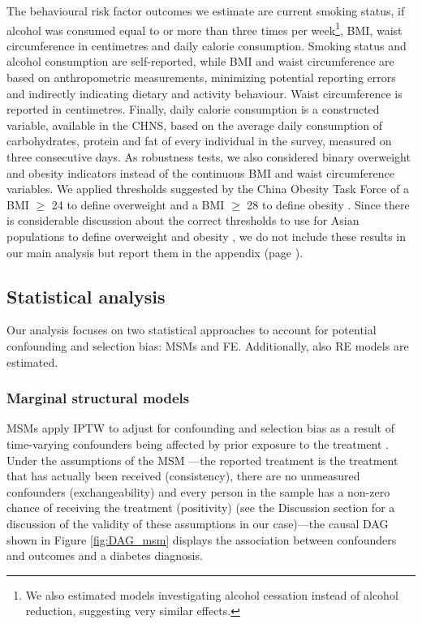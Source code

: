 The behavioural risk factor outcomes we estimate are current smoking status, if alcohol was consumed equal to or more than three times per week\footnote{We also estimated models investigating alcohol cessation instead of alcohol reduction, suggesting very similar effects.}, \ac{BMI}, waist circumference in centimetres and daily calorie consumption. Smoking status and alcohol consumption are self-reported, while \ac{BMI} and waist circumference are based on anthropometric measurements, minimizing potential reporting errors and indirectly indicating dietary and activity behaviour. Waist circumference is reported in centimetres. Finally, daily calorie consumption is a constructed variable, available in the \ac{CHNS}, based on the average daily consumption of carbohydrates, protein and fat of every individual in the survey, measured on three consecutive days. As robustness tests, we also considered binary overweight and obesity indicators instead of the continuous \ac{BMI} and waist circumference variables. We applied thresholds suggested by the China Obesity Task Force of a \ac{BMI} $\geq$ 24 to define overweight and a \ac{BMI} $\geq$ 28 to define obesity \parencite{group2004body}. Since there is considerable discussion about the correct thresholds to use for Asian populations to define overweight and obesity \parencite{WHO2004,He2015,Zeng2014a}, we do not include these results in our main analysis but report them in the appendix (page \pageref{tab:obesity_binary}). 


\subsection{Statistical analysis}


Our analysis focuses on two statistical approaches to account for potential confounding and selection bias: \acfp{MSM} and \acf{FE}. Additionally, also \ac{RE} models are estimated.

\subsubsection{Marginal structural models}

\acp{MSM} apply \DIFdelbegin {}\DIFdelend \DIFaddbegin \ac{IPTW} \DIFaddend to adjust for confounding and selection bias as a result of time-varying confounders being affected by prior exposure to the treatment \DIFdelbegin %
\DIFdelend \DIFaddbegin \parencite{Robins2000}\DIFaddend . Under the assumptions of the \ac{MSM}  \DIFdelbegin %
\DIFdelend \DIFaddbegin \parencite{Robins2000}\DIFaddend ---the reported treatment is the treatment that has actually been received (consistency), there are no unmeasured confounders (exchangeability) and every person in the sample has a non-zero chance of receiving the treatment (positivity) (see the Discussion section for a discussion of the validity of these assumptions in our case)---the causal \ac{DAG} shown in Figure \ref{fig:DAG_msm} displays the association between confounders and outcomes and a diabetes diagnosis.

